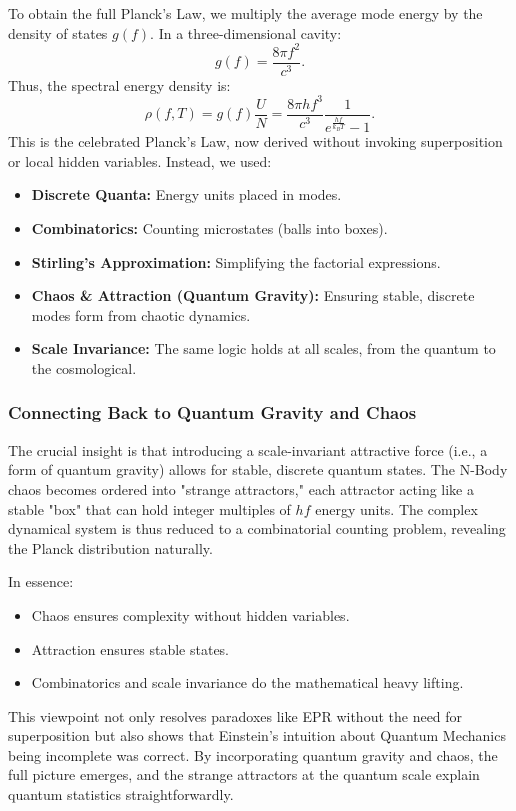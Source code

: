 \documentclass{article}
\begin{document}
To obtain the full Planck’s Law, we multiply the average mode energy by the density of states $g(f)$. In a three-dimensional cavity:
\[
g(f) = \frac{8\pi f^2}{c^3}.
\]
\newline
Thus, the spectral energy density is:
\[
\rho(f,T) = g(f)\frac{U}{N} = \frac{8\pi h f^3}{c^3} \frac{1}{e^{\frac{hf}{k_B T}} - 1}.
\]
\newline
This is the celebrated Planck’s Law, now derived without invoking superposition or local hidden variables. Instead, we used:
\begin{itemize}[nosep]
    \item \textbf{Discrete Quanta:} Energy units placed in modes.
    \item \textbf{Combinatorics:} Counting microstates (balls into boxes).
    \item \textbf{Stirling’s Approximation:} Simplifying the factorial expressions.
    \item \textbf{Chaos \& Attraction (Quantum Gravity):} Ensuring stable, discrete modes form from chaotic dynamics.
    \item \textbf{Scale Invariance:} The same logic holds at all scales, from the quantum to the cosmological.
\end{itemize}
\subsubsection*{Connecting Back to Quantum Gravity and Chaos}

The crucial insight is that introducing a scale-invariant attractive force (i.e., a form of quantum gravity) allows for stable, discrete quantum states. The N-Body chaos becomes ordered into "strange attractors," each attractor acting like a stable "box" that can hold integer multiples of $hf$ energy units. The complex dynamical system is thus reduced to a combinatorial counting problem, revealing the Planck distribution naturally.

In essence:
\begin{itemize}[nosep]
    \item Chaos ensures complexity without hidden variables.
    \item Attraction ensures stable states.
    \item Combinatorics and scale invariance do the mathematical heavy lifting.
\end{itemize}

This viewpoint not only resolves paradoxes like EPR without the need for superposition but also shows that Einstein’s intuition about Quantum Mechanics being incomplete was correct. By incorporating quantum gravity and chaos, the full picture emerges, and the strange attractors at the quantum scale explain quantum statistics straightforwardly.
\end{document}
